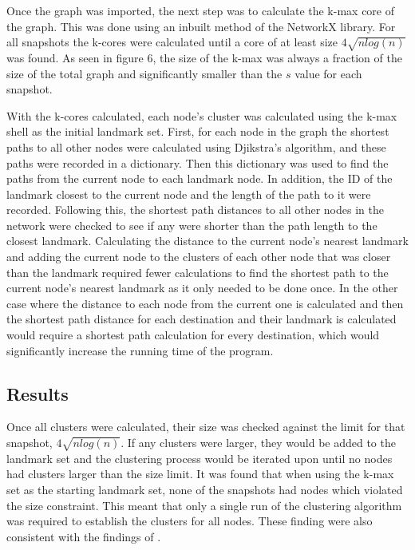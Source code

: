 \documentclass{mpaper}
\begin{document}
Once the graph was imported, the next step was to calculate the k-max core of the graph. This was done using an inbuilt method of the NetworkX library. For all snapshots the k-cores were calculated until a core of at least size $4\sqrt{nlog(n)}$ was found. As seen in figure 6, the size of the k-max was always a fraction of the size of the total graph and significantly smaller than the $s$ value for each snapshot. 

With the k-cores calculated, each node's cluster was calculated using the k-max shell as the initial landmark set. First, for each node in the graph the shortest paths to all other nodes were calculated using Djikstra's algorithm, and these paths were recorded in a dictionary. Then this dictionary was used to find the paths from the current node to each landmark node. In addition, the ID of the landmark closest to the current node and the length of the path to it were recorded. Following this, the shortest path distances to all other nodes in the network were checked to see if any were shorter than the path length to the closest landmark. Calculating the distance to the current node's nearest landmark and adding the current node to the clusters of each other node that was closer than the landmark required fewer calculations to find the shortest path to the current node's nearest landmark as it only needed to be done once. In the other case where the distance to each node from the current one is calculated and then the shortest path distance for each destination and their landmark is calculated would require a shortest path calculation for every destination, which would significantly increase the running time of the program. 

\subsection{Results}

Once all clusters were calculated, their size was checked against the limit for that snapshot, $4\sqrt{nlog(n)}$. If any clusters were larger, they would be added to the landmark set and the clustering process would be iterated upon until no nodes had clusters larger than the size limit. It was found that when using the k-max set as the starting landmark set, none of the snapshots had nodes which violated the size constraint. This meant that only a single run of the clustering algorithm was required to establish the clusters for all nodes. These finding were also consistent with the findings of \cite{strowes}. 
\end{document}
